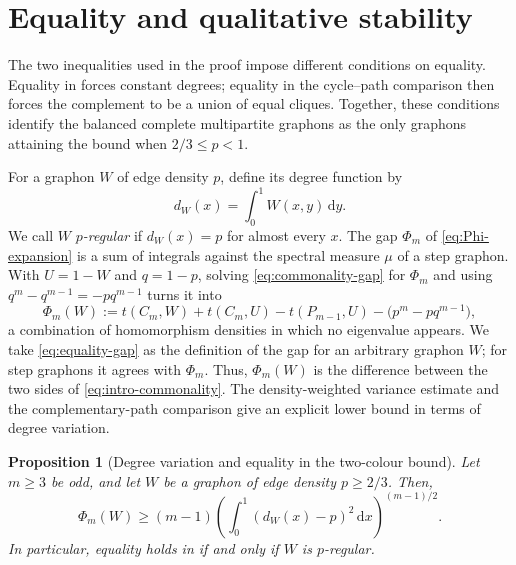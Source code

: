 \documentclass[11pt]{article}
\newtheorem{proposition}[theorem]{Proposition}
\numberwithin{equation}{section}
\newcommand{\dd}{\,\mathrm d}
\newcommand{\tC}[2]{t(C_{#1},#2)}
\newcommand{\tP}[2]{t(P_{#1},#2)}
\newcommand{\dW}{d_W}
\begin{document}
\section{Equality and qualitative stability}
\label{sec:equality-stability}

The two inequalities used in the proof impose different conditions on equality.
Equality in  forces constant degrees; equality in the cycle--path comparison then forces the complement to be a union of equal cliques.
Together, these conditions identify the balanced complete multipartite graphons as the only graphons attaining the bound when $2/3\le p<1$.

For a graphon $W$ of edge density $p$, define its degree function by
\[
  \dW(x)=\int_0^1 W(x,y)\dd y.
\]
We call $W$ \emph{$p$-regular} if $\dW(x)=p$ for almost every $x$.
The gap $\Phi_m$ of \eqref{eq:Phi-expansion} is a sum of integrals against the spectral measure $\mu$ of a step graphon.
With $U=1-W$ and $q=1-p$, solving \eqref{eq:commonality-gap} for $\Phi_m$ and using $q^m-q^{m-1}=-pq^{m-1}$ turns it into
\begin{equation}\label{eq:equality-gap}
  \Phi_m(W):=\tC mW+\tC mU-\tP{m-1}U-\bigl(p^m-pq^{m-1}\bigr),
\end{equation}
a combination of homomorphism densities in which no eigenvalue appears.
We take \eqref{eq:equality-gap} as the definition of the gap for an arbitrary graphon $W$; for step graphons it agrees with $\Phi_m$.
Thus, $\Phi_m(W)$ is the difference between the two sides of \eqref{eq:intro-commonality}.
The density-weighted variance estimate and the complementary-path comparison give an explicit lower bound in terms of degree variation.

\begin{proposition}[Degree variation and equality in the two-colour bound]
\label{prop:regularity-gap}
  Let $m\ge3$ be odd, and let $W$ be a graphon of edge density $p\ge2/3$.
  Then,
  \begin{equation}\label{eq:degree-variance-gap}
    \Phi_m(W)\ge(m-1)
    \left(\int_0^1(\dW(x)-p)^2\dd x\right)^{(m-1)/2}.
  \end{equation}
  In particular, equality holds in  if and only if $W$ is $p$-regular.
\end{proposition}
\end{document}
